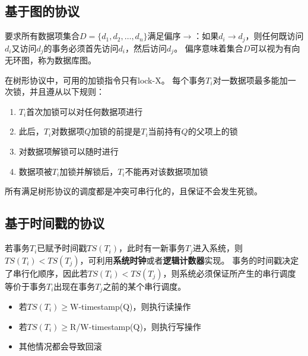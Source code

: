 \subsection{基于图的协议}
要求所有数据项集合$D=\{d_1,d_2,\ldots,d_n\}$满足偏序$\to$：如果$d_i\to d_j$，则任何既访问$d_i$又访问$d_j$的事务必须首先访问$d_i$，然后访问$d_j$。
偏序意味着集合$D$可以视为有向无环图，称为数据库图。

在树形协议中，可用的加锁指令只有lock-X。
每个事务$T_i$对一数据项最多能加一次锁，并且遵从以下规则：
\begin{enumerate}
	\item $T_i$首次加锁可以对任何数据项进行
	\item 此后，$T_i$对数据项$Q$加锁的前提是$T_i$当前持有$Q$的父项上的锁
	\item 对数据项解锁可以随时进行
	\item 数据项被$T_i$加锁并解锁后，$T_i$不能再对该数据项加锁
\end{enumerate}
所有满足树形协议的调度都是冲突可串行化的，且保证不会发生死锁。

\subsection{基于时间戳的协议}
若事务$T_i$已赋予时间戳$TS(T_i)$，此时有一新事务$T_j$进入系统，则$TS(T_i)<TS(T_j)$，可利用\textbf{系统时钟}或者\textbf{逻辑计数器}实现。
事务的时间戳决定了串行化顺序，因此若$TS(T_i)<TS(T_j)$，则系统必须保证所产生的串行调度等价于事务$T_i$出现在事务$T_j$之前的某个串行调度。

\begin{itemize}
	\item 若$TS(T_i)\geq$W-timestamp(Q)，则执行读操作
	\item 若$TS(T_i)\geq$R/W-timestamp(Q)，则执行写操作
	\item 其他情况都会导致回滚
\end{itemize}